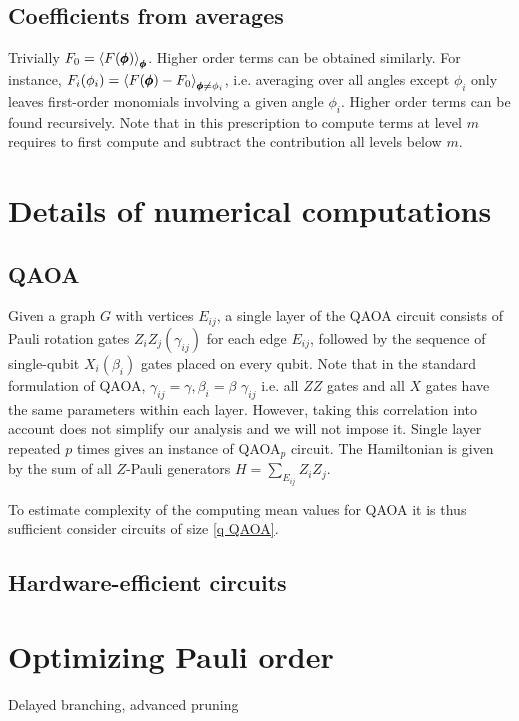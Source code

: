 \documentclass[twocolumn, amsfonts, amssymb, aps, nofootinbib]{revtex4-2}
\begin{document}
\subsection{Coefficients from averages}
Trivially $F_0=\Braket{F(\pmb\phi)}_{\pmb\phi}$. Higher order terms can be obtained similarly. For instance, $F_i(\phi_i)=\Braket{F(\pmb\phi)-F_0}_{\pmb\phi\neq\phi_i}$, i.e. averaging over all angles except $\phi_i$ only leaves first-order monomials involving a given angle $\phi_i$. Higher order terms can be found recursively. Note that in this prescription to compute terms at level $m$ requires to first compute and subtract the contribution all levels below $m$.
\section{Details of numerical computations}
\subsection{QAOA} \label{app QAOA}
Given a graph $G$ with vertices $E_{ij}$, a single layer of the QAOA circuit consists of Pauli rotation gates $Z_iZ_j(\gamma_{ij})$ for each edge $E_{ij}$, followed by the sequence of single-qubit $X_i(\beta_i)$ gates placed on every qubit. Note that in the standard formulation of QAOA, $\gamma_{ij}=\gamma, \beta_i=\beta$ $\gamma_{ij}$ i.e. all $ZZ$ gates and all $X$ gates have the same parameters within each layer. However, taking this correlation into account does not simplify our analysis and we will not impose it. Single layer repeated $p$ times gives an instance of QAOA${}_p$ circuit. The Hamiltonian is given by the sum of all $Z$-Pauli generators $H=\sum_{E_{ij}}Z_iZ_j$.

 To estimate complexity of the computing mean values for QAOA it is thus sufficient consider circuits of size \eqref{q QAOA}.
\subsection{Hardware-efficient circuits} \label{app HEA}


\section{Optimizing Pauli order}
Delayed branching, advanced pruning


\end{document}
